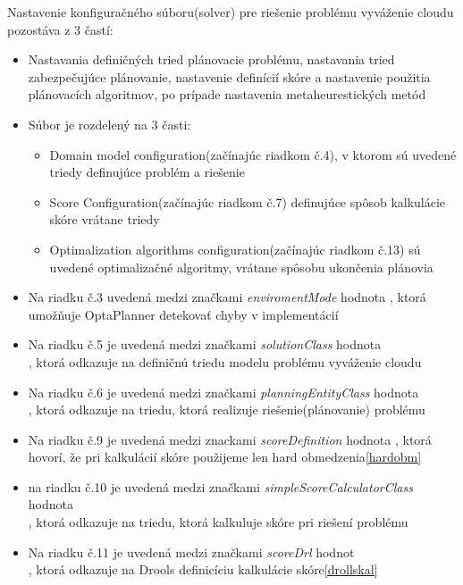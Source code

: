 \newpage
Nastavenie konfiguračného súboru(solver) pre riešenie problému vyváženie cloudu pozostáva z 3 častí: 
\begin{itemize}
\item Nastavania definičných tried plánovacie problému, nastavania tried zabezpečujúce plánovanie, nastavenie definícií skóre a nastavenie použitia plánovacích algoritmov, po prípade nastavenia metaheurestických metód
\item Súbor je rozdelený na 3 časti:
\begin{itemize}
\item Domain model configuration(začínajúc riadkom č.4), v ktorom sú uvedené triedy definujúce problém a riešenie
\item Score Configuration(začínajúc riadkom č.7) definujúce spôsob kalkulácie skóre vrátane triedy
\item Optimalization algorithms configuration(začínajúc riadkom č.13) sú uvedené optimalizačné algoritmy, vrátane spôsobu ukončenia plánovia
\end{itemize}
\item Na riadku č.3 uvedená medzi značkami \emph{enviromentMode} hodnota , ktorá umožňuje OptaPlanner detekovať chyby v implementácií
\item Na riadku č.5 je uvedená medzi značkami \emph{solutionClass} hodnota \\, ktorá odkazuje na definičnú triedu modelu problému vyváženie cloudu
\item Na riadku č.6 je uvedená medzi značkami \emph{planningEntityClass} hodnota \\, ktorá odkazuje na triedu, ktorá realizuje riešenie(plánovanie) problému
\item Na riadku č.9 je uvedená medzi znackami \emph{scoreDefinition} hodnota , ktorá hovorí, že pri kalkulácií skóre použijeme len hard obmedzenia\ref{hardobm}
\item na riadku č.10 je uvedená medzi značkami \emph{simpleScoreCalculatorClass} hodnota \\, ktorá odkazuje na triedu, ktorá kalkuluje skóre pri riešení problému
\item Na riadku č.11 je uvedená medzi značkami \emph{scoreDrl} hodnot \\, ktorá odkazuje na Drools definicíciu kalkulácie skóre\ref{drollskal}

\end{itemize}
